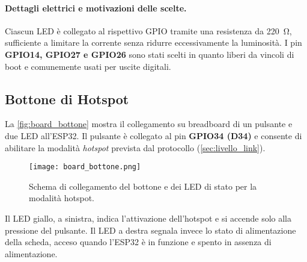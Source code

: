 \begin{table}[H]
  \centering
  \label{tab:led_pins}
  \caption{Mappatura hardware dei pin di uscita dell’ESP32 verso i LED di stato.}
\end{table}

\paragraph{Dettagli elettrici e motivazioni delle scelte.}
Ciascun LED è collegato al rispettivo GPIO tramite una resistenza da \SI{220}{\ohm}, sufficiente a limitare la corrente senza ridurre eccessivamente la luminosità.  
I pin \textbf{GPIO14, GPIO27 e GPIO26} sono stati scelti in quanto liberi da vincoli di boot e comunemente usati per uscite digitali.  

\subsection{Bottone di Hotspot}
\label{subsec:button_hotspot}

La \autoref{fig:board_bottone} mostra il collegamento su breadboard di un pulsante e due LED all’ESP32.  
Il pulsante è collegato al pin \textbf{GPIO34 (D34)} e consente di abilitare la modalità \textit{hotspot} prevista dal protocollo (\ref{sec:livello_link}).  

\begin{figure}[H]
  \centering
  \texttt{[image: board\_bottone.png]}
  \caption{Schema di collegamento del bottone e dei LED di stato per la modalità hotspot.}
  \label{fig:board_bottone}
\end{figure}

Il LED giallo, a sinistra, indica l’attivazione dell’hotspot e si accende solo alla pressione del pulsante.  
Il LED a destra segnala invece lo stato di alimentazione della scheda, acceso quando l’ESP32 è in funzione e spento in assenza di alimentazione.  
 
